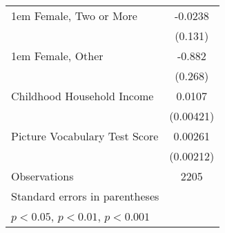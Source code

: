 \documentclass[9pt]{extarticle}
\begin{document}
{\begin{longtable}[l]{l*{1}{c}}
\kern 1em Female, Two or More                     &                  -0.0238         \\
                                                  &                  (0.131)         \\
[0.3em]
\kern 1em Female, Other                           &                   -0.882\sym{**} \\
                                                  &                  (0.268)         \\
[0.3em]
Childhood Household Income						  &                   0.0107\sym{*}  \\
                                                  &                (0.00421)         \\
[0.3em]
Picture Vocabulary Test Score					  &                  0.00261         \\
                                                  &                (0.00212)         \\
\hline
Observations                                      &                     2205         \\
\hline\hline
\multicolumn{2}{l}{\footnotesize Standard errors in parentheses}\\
\multicolumn{2}{l}{\footnotesize \sym{*} \(p<0.05\), \sym{**} \(p<0.01\), \sym{***} \(p<0.001\)}\\
\end{longtable}
}
\end{document}

